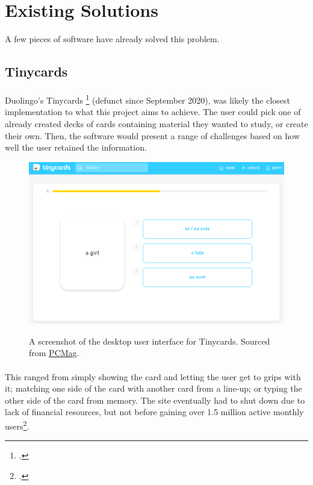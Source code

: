 \documentclass{report}
\begin{document}
\section{Existing Solutions}
A few pieces of software have already solved this problem. 

\subsection{Tinycards}
\paragraph{}
Duolingo's Tinycards \footcite{Tinycards} (defunct since September 2020), was likely the closest implementation to what this project aims to achieve. The user could pick one of already created decks of cards containing material they wanted to study, or create their own. Then, the software would present a range of challenges based on how well the user retained the information. 

\begin{figure}[h!]
  \includegraphics[width=\linewidth]{./media/tinycards.png}
  \label{fig:tinycards1}
  \caption{A screenshot of the desktop user interface for Tinycards. Sourced from \href{https://web.archive.org/web/20211005121604/https://www.pcmag.com/reviews/tinycards-by-duolingo}{PCMag}.}
\end{figure}

\paragraph{}
This ranged from simply showing the card and letting the user get to grips with it; matching one side of the card with another card from a line-up; or typing the other side of the card from memory. The site eventually had to shut down due to lack of financial resources, but not before gaining over 1.5 million active monthly users\footcite{TinycardsShutdown}.
\end{document}
